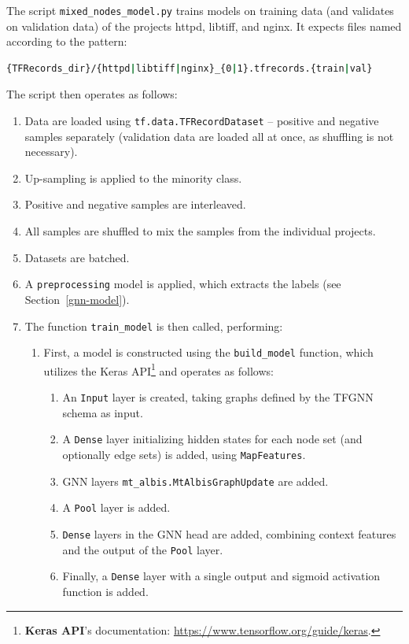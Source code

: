 The script \texttt{mixed\_nodes\_model.py} trains models on training data (and validates on validation data) of the projects httpd, libtiff, and nginx. It expects files named according to the pattern:
\begin{lstlisting}[language=bash, xleftmargin=2em]
{TFRecords_dir}/{httpd|libtiff|nginx}_{0|1}.tfrecords.{train|val}
\end{lstlisting}
The script then operates as follows:
\begin{enumerate}
    \item Data are loaded using \texttt{tf.data.TFRecordDataset} -- positive and negative samples separately (validation data are loaded all at once, as shuffling is not necessary).
    \item Up-sampling is applied to the minority class.
    \item Positive and negative samples are interleaved.
    \item All samples are shuffled to mix the samples from the individual projects.
    \item Datasets are batched.
    \item A \texttt{preprocessing} model is applied, which extracts the labels (see Section~\ref{gnn-model}).
    \item The function \texttt{train\_model} is then called, performing:
    \begin{enumerate}
        \item First, a model is constructed using the \texttt{build\_model} function, which utilizes the Keras API\footnote{\textbf{Keras API}'s documentation: \url{https://www.tensorflow.org/guide/keras}.} and operates as follows:
        \begin{enumerate}
            \item An \texttt{Input} layer is created, taking graphs defined by the TFGNN schema as input.
            \item A \texttt{Dense} layer initializing hidden states for each node set (and optionally edge sets) is added, using \texttt{MapFeatures}.
            \item GNN layers \texttt{mt\_albis.MtAlbisGraphUpdate} are added.
            \item A \texttt{Pool} layer is added.
            \item \texttt{Dense} layers in the GNN head are added, combining context features and the output of the \texttt{Pool} layer.
            \item Finally, a \texttt{Dense} layer with a single output and sigmoid activation function is added.

\end{enumerate}
\end{enumerate}
\end{enumerate}
